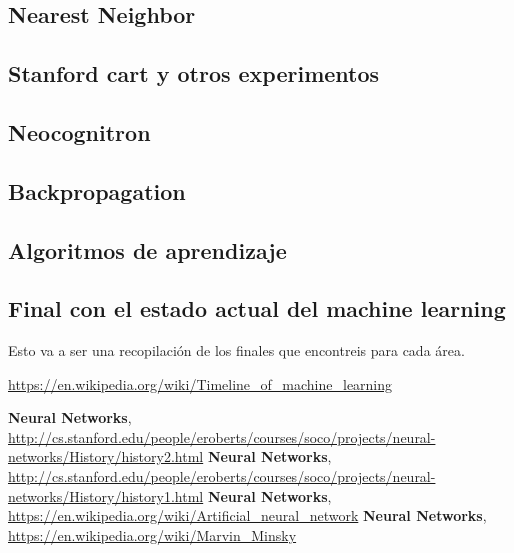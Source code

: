 \documentclass[a4paper, 11pt]{article} %
\begin{document}
\subsection{Nearest Neighbor}
\subsection{Stanford cart y otros experimentos}
\subsection{Neocognitron}
\subsection{Backpropagation}
\subsection{Algoritmos de aprendizaje}
\subsection{Final con el estado actual del machine learning}
Esto va a ser una recopilación de los finales que encontreis para cada área.
\begin{thebibliography}{9}

 \url{https://en.wikipedia.org/wiki/Timeline_of_machine_learning}

	\textbf{Neural Networks},
  \url{http://cs.stanford.edu/people/eroberts/courses/soco/projects/neural-networks/History/history2.html}
 	\textbf{Neural Networks},
 \url{http://cs.stanford.edu/people/eroberts/courses/soco/projects/neural-networks/History/history1.html}
 	\textbf{Neural Networks},
 \url{https://en.wikipedia.org/wiki/Artificial_neural_network}
 	\textbf{Neural Networks},
 \url{https://en.wikipedia.org/wiki/Marvin_Minsky}

\end{thebibliography}
\end{document}
